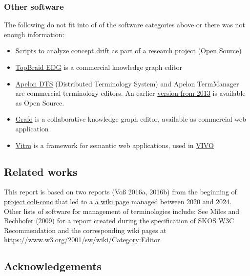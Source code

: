 \documentclass[
  DIV=10]{article}
\providecommand{\tightlist}{%
  \setlength{\itemsep}{0pt}\setlength{\parskip}{0pt}}
\begin{document}
\subsubsection{Other software}\label{other-software}

The following do not fit into of of the software categories above or
there was not enough information:

\begin{itemize}
\tightlist
\item
  \href{https://github.com/Multilingual-LGBTQIA-Vocabularies/Examing_LGBTQ_Concepts}{Scripts
  to analyze concept drift} as part of a research project (Open Source)
\item
  \href{https://www.topquadrant.com/topbraid-edg/}{TopBraid EDG} is a
  commercial knowledge graph editor
\item
  \href{https://www.apelondts.org/}{Apelon DTS} (Distributed Terminology
  System) and Apelon TermManager are commercial terminology editors. An
  earlier \href{https://apelon-dts.sourceforge.net/}{version from 2013}
  is available as Open Source.
\item
  \href{https://gra.fo/}{Grafo} is a collaborative knowledge graph
  editor, available as commercial web application
\item
  \href{https://github.com/vivo-project/Vitro}{Vitro} is a framework for
  semantic web applications, used in \href{https://vivoweb.org/}{VIVO}
\end{itemize}

\subsection{Related works}\label{related-works}

This report is based on two reports (Voß 2016a, 2016b) from the
beginning of \href{https://coli-conc.gbv.de/}{project coli-conc} that
led to a
\href{https://github.com/gbv/bartoc.org/wiki/Software-for-controlled-vocabularies}{a
wiki page} managed between 2020 and 2024. Other lists of software for
management of terminologies include: See Miles and Bechhofer (2009) for
a report created during the specification of SKOS W3C Recommendation and
the corresponding wiki pages at
\url{https://www.w3.org/2001/sw/wiki/Category:Editor}.

\subsection{Acknowledgements}\label{acknowledgements}
\end{document}
